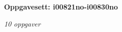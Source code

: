 \centerline{\bf Oppgavesett: i00821no-i00830no}
\vskip 10pt
\centerline{\it 10 oppgaver}\vskip 10pt
\vskip 10pt
